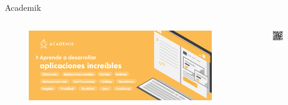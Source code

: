 \documentclass[aspectratio=169]{beamer}
\begin{document}
\begin{frame}{Academik}
    \begin{columns}
        \begin{column}{0.7\textwidth}
            \begin{figure}
                \centering
                \includegraphics[width=\linewidth]{Images/academik}
            \end{figure}
        \end{column}
        \begin{column}{0.3\textwidth}  %
            \begin{figure}
                \centering
                \includegraphics[width=\linewidth]{Images/qr}
            \end{figure}
        \end{column}
    \end{columns}
\end{frame}
\end{document}

